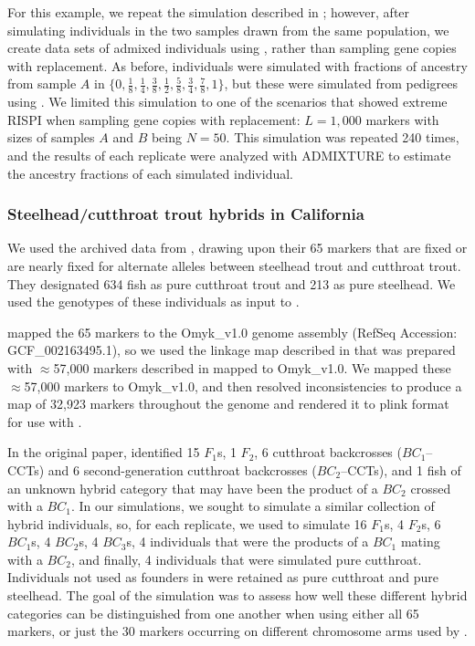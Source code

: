 {For this example, we repeat the simulation described in {\em {}};
however, after simulating individuals in the two samples drawn from the same population,
we create data sets of admixed individuals using \gscramble{}, rather than sampling
gene copies with replacement.  As before, individuals were simulated with fractions of
ancestry from sample $A$ in $\{0, \frac{1}{8}, \frac{1}{4}, \frac{3}{8}, \frac{1}{2}, \frac{5}{8}, \frac{3}{4}, \frac{7}{8}, 1\}$, but these were simulated from pedigrees using \gscramble{}.  We limited
this simulation to one of the scenarios that showed extreme RISPI when sampling gene
copies with replacement: $L=1,000$ markers with sizes of samples $A$ and $B$ being
$N=50$. This simulation was repeated 240 times, and the results of each replicate were analyzed with
ADMIXTURE to estimate the ancestry fractions of each simulated individual.

\subsubsection*{Steelhead/cutthroat trout hybrids in California}

We used the archived data from \citet{rizza2023limited}, drawing upon their 65 markers
that are fixed or are nearly fixed for alternate alleles between steelhead trout and cutthroat trout.
They designated 634 fish as pure cutthroat trout and 213 as pure steelhead.  We used the
genotypes of these individuals as input to \gscramble{}.

\citeauthor{rizza2023limited} mapped the 65 markers to the Omyk\_v1.0 genome assembly (RefSeq 
Accession: GCF\_002163495.1), so we used
the linkage map described in \citep{pearse2019sex} that was prepared 
with $\approx$57,000 markers described in \citet{palti2015development} mapped to Omyk\_v1.0. We mapped these $\approx$57,000 markers to Omyk\_v1.0, and then resolved inconsistencies to produce a map
of 32,923 markers throughout the genome and rendered it to plink format for use with \gscramble{}.

In the original paper, \citet{rizza2023limited} identified 15 $F_1$s,
1 $F_2$,
6 cutthroat backcrosses ($BC_1$--CCTs) and 
6 second-generation cutthroat backcrosses ($BC_2$--CCTs),
and 1 fish of an unknown hybrid category that may have been the
product of a $BC_2$ crossed with a $BC_1$.   In our simulations, we sought to simulate
a similar collection of hybrid individuals, so, for each replicate, we used
\gscramble{} to simulate 16 $F_1$s, 4 $F_2$s, 6 $BC_1$s, 4 $BC_2$s, 4 $BC_3$s,  4 individuals
that were the products of a $BC_1$ mating with a $BC_2$, and finally, 4 individuals that were simulated pure cutthroat. Individuals not used as founders
in \gscramble{} were retained as pure cutthroat and pure steelhead.  The goal of the simulation
was to assess how well these different hybrid categories can be distinguished from one another
when using either all 65 markers, or just the 30 markers occurring on different chromosome arms
used by  \citet{rizza2023limited}.

}

